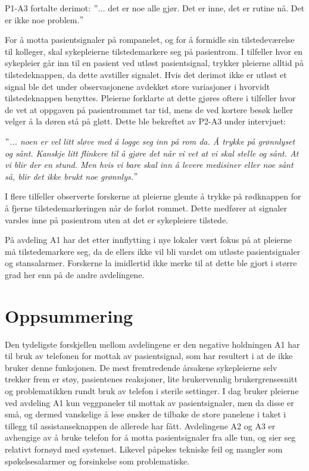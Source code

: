 \noindent
P1-A3 fortalte derimot: $"$... det er noe alle gjør. Det er inne, det er rutine nå. Det er ikke noe problem.$"$ 

\noindent
For å motta pasientsignaler på rompanelet, og for å formidle sin tilstedeværelse til kolleger, skal sykepleierne tilstedemarkere seg på pasientrom. I tilfeller hvor en sykepleier går inn til en pasient ved utløst pasientsignal, trykker pleierne alltid på tilstedeknappen, da dette avstiller signalet. Hvis det derimot ikke er utløst et signal ble det under observasjonene avdekket store variasjoner i hvorvidt tilstedeknappen benyttes. Pleierne forklarte at dette gjøres oftere i tilfeller hvor de vet at oppgaven på pasientrommet tar tid, mens de ved kortere besøk heller velger å la døren stå på gløtt. Dette ble bekreftet av P2-A3 under intervjuet: 

\noindent
\textit{$"$... noen er vel litt sløve med å logge seg inn på rom da. Å trykke på grønnlyset og sånt. Kanskje litt flinkere til å gjøre det når vi vet at vi skal stelle og sånt. At vi blir der en stund. Men hvis vi bare skal inn å levere medisiner eller noe sånt så, blir det ikke brukt noe grønnlys.$"$}

\noindent
I flere tilfeller observerte forskerne at pleierne glemte å trykke på rødknappen for å fjerne tilstedemarkeringen når de forlot rommet. Dette medfører at signaler varsles inne på pasientrom uten at det er sykepleiere tilstede.

\noindent
På avdeling A1 har det etter innflytting i nye lokaler vært fokus på at pleierne må tilstedemarkere seg, da de ellers ikke vil bli varslet om utløste pasientsignaler og stansalarmer. Forskerne la imidlertid ikke merke til at dette ble gjort i større grad her enn på de andre avdelingene.  

\section{Oppsummering}
Den tydeligste forskjellen mellom avdelingene er den negative holdningen A1 har til bruk av telefonen for mottak av pasientsignal, som har resultert i at de ikke bruker denne funksjonen. De mest fremtredende årsakene sykepleierne selv trekker frem er støy, pasientenes reaksjoner, lite brukervennlig brukergrensesnitt og problematikken rundt bruk av telefon i sterile settinger. I dag bruker pleierne ved avdeling A1 kun veggpaneler til mottak av pasientsignaler, men da disse er små, og dermed vanskelige å lese ønsker de tilbake de store panelene i taket i tillegg til assistanseknappen de allerede har fått. Avdelingene A2 og A3 er avhengige av å bruke telefon for å motta pasientsignaler fra alle tun, og sier seg relativt fornøyd med systemet. Likevel påpekes tekniske feil og mangler som spøkelsesalarmer og forsinkelse som problematiske. 

